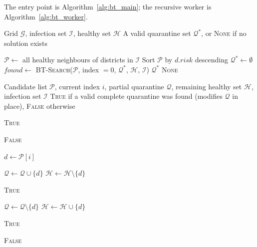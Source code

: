 \documentclass[conference]{IEEEtran}
\begin{document}
The entry point is Algorithm~\ref{alg:bt_main}; the recursive worker is
Algorithm~\ref{alg:bt_worker}.

\begin{algorithm}[ht]
\caption{Backtracking Quarantine — Main Entry}
\label{alg:bt_main}
\begin{algorithmic}[1]
\REQUIRE Grid $\mathcal{G}$, infection set $\mathcal{I}$, healthy set $\mathcal{H}$
\ENSURE A valid quarantine set $\mathcal{Q}^*$, or \textsc{None} if no solution exists

\STATE $\mathcal{P} \leftarrow$ all healthy neighbours of districts in $\mathcal{I}$
\STATE Sort $\mathcal{P}$ by $d.\mathit{risk}$ descending
\STATE $\mathcal{Q}^* \leftarrow \emptyset$
\STATE $\mathit{found} \leftarrow$ \textsc{BT-Search}($\mathcal{P}$, index $= 0$, $\mathcal{Q}^*$, $\mathcal{H}$, $\mathcal{I}$)
  \RETURN $\mathcal{Q}^*$
\ELSE
  \RETURN \textsc{None}
\ENDIF
\end{algorithmic}
\end{algorithm}

\begin{algorithm}[ht]
\caption{BT-Search — Recursive Backtracking Worker}
\label{alg:bt_worker}
\begin{algorithmic}[1]
\REQUIRE Candidate list $\mathcal{P}$, current index $i$, partial quarantine $\mathcal{Q}$,
         remaining healthy set $\mathcal{H}$, infection set $\mathcal{I}$
\ENSURE \textsc{True} if a valid complete quarantine was found (modifies $\mathcal{Q}$ in place),
        \textsc{False} otherwise

  \RETURN \textsc{True}
\ENDIF

  \RETURN \textsc{False}
\ENDIF

\STATE $d \leftarrow \mathcal{P}[i]$

\STATE $\mathcal{Q} \leftarrow \mathcal{Q} \cup \{d\}$
\STATE $\mathcal{H} \leftarrow \mathcal{H} \setminus \{d\}$

    \RETURN \textsc{True}
  \ENDIF
\ENDIF

\STATE $\mathcal{Q} \leftarrow \mathcal{Q} \setminus \{d\}$
\STATE $\mathcal{H} \leftarrow \mathcal{H} \cup \{d\}$

  \RETURN \textsc{True}
\ENDIF

\RETURN \textsc{False}
\end{algorithmic}
\end{algorithm}
\end{document}
